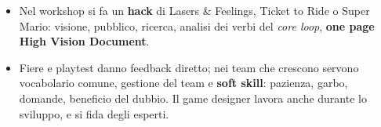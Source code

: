 \begin{itemize}
        (generiche) e \textbf{idiomi} (specifici del gioco), emozioni (Plutchik,
        6-11, piaceri di LeBlanc), ambienti e \textbf{forme} (cerchio, quadrato,
        triangolo).
  \item Nel workshop si fa un \textbf{hack} di Lasers \& Feelings, Ticket to Ride
        o Super Mario: visione, pubblico, ricerca, analisi dei verbi del
        \emph{core loop}, \textbf{one page High Vision Document}.
  \item Fiere e playtest danno feedback diretto; nei team che crescono servono
        vocabolario comune, gestione del team e \textbf{soft skill}: pazienza,
        garbo, domande, beneficio del dubbio. Il game designer lavora anche
        durante lo sviluppo, e si fida degli esperti.
\end{itemize}
